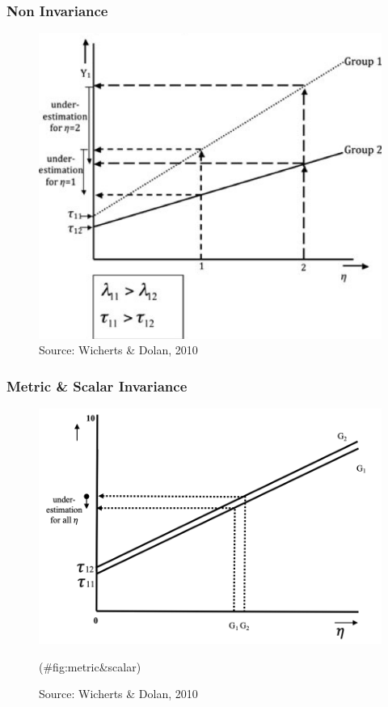 \documentclass[
]{book}
\begin{document}
\hypertarget{non-invariance}{%
\subsubsection{Non Invariance}\label{non-invariance}}

\begin{figure}
\includegraphics[width=0.8\linewidth]{Picture2} \caption{Source: Wicherts & Dolan, 2010}\label{fig:non}
\end{figure}

\hypertarget{metric-scalar-invariance}{%
\subsubsection{Metric \& Scalar Invariance}\label{metric-scalar-invariance}}

\begin{figure}
\includegraphics[width=0.8\linewidth]{metric_scalar} \caption{Source: Wicherts & Dolan, 2010}(\#fig:metric&scalar)
\end{figure}
\end{document}
